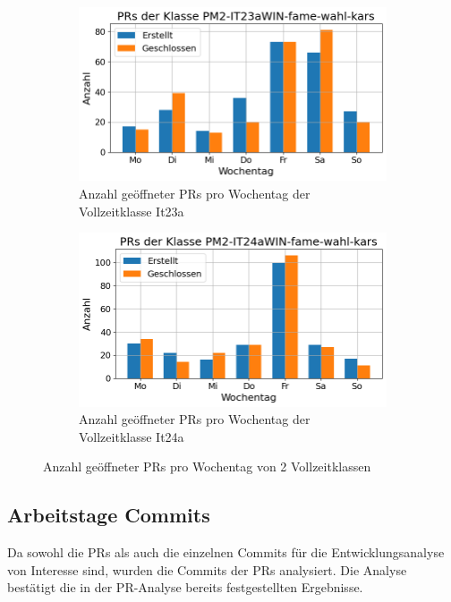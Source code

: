 \begin{figure}[htbp]
    \centering
    \begin{subfigure}[b]{0.48\textwidth}
        \centering
        \includegraphics[width=\textwidth]{Figures/pr-klasse-per-wochentag-23a.png}
         \caption{Anzahl geöffneter PRs pro Wochentag der Vollzeitklasse It23a}
        \label{fig:anzahl-prs-pro-wochentag-it23a}
    \end{subfigure}
    \hfill
    \begin{subfigure}[b]{0.48\textwidth}
        \centering
        \includegraphics[width=\textwidth]{Figures/pr-klasse-per-wochentag-24a.png}
         \caption{Anzahl geöffneter PRs pro Wochentag der Vollzeitklasse It24a}
        \label{fig:anzahl-prs-pro-wochentag-it24a}
    \end{subfigure}
    \caption{Anzahl geöffneter PRs pro Wochentag von 2 Vollzeitklassen}
    \label{fig:anz-prs-vollzeit-pro-wochentag}
\end{figure}

\subsection{Arbeitstage Commits}
Da sowohl die PRs als auch die einzelnen Commits für die Entwicklungsanalyse von Interesse sind, wurden die Commits der PRs analysiert.
Die Analyse bestätigt die in der PR-Analyse bereits festgestellten Ergebnisse.

